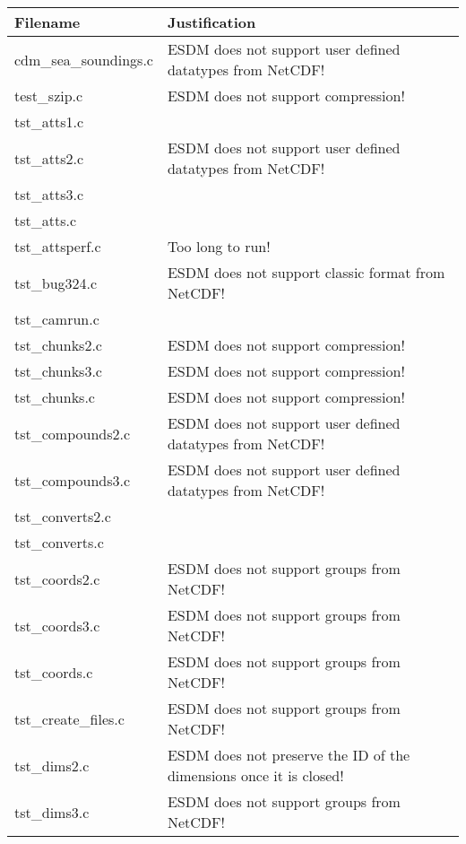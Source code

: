 \begin{table}[H]
\centering
\begin{tabular}{|l|l|}
\hline
Filename & Justification \\ \hline \hline
cdm\_sea\_soundings.c   & ESDM does not support user defined datatypes from NetCDF!          \\ \hline
test\_szip.c   &  ESDM does not support compression!         \\ \hline
tst\_atts1.c   &           \\ \hline
tst\_atts2.c   &  ESDM does not support user defined datatypes from NetCDF!         \\ \hline
tst\_atts3.c   &           \\ \hline
tst\_atts.c   &           \\ \hline
tst\_attsperf.c   &  Too long to run!         \\ \hline
tst\_bug324.c   &  ESDM does not support classic format from NetCDF!         \\ \hline
tst\_camrun.c   &           \\ \hline
tst\_chunks2.c   &  ESDM does not support compression!         \\ \hline
tst\_chunks3.c   & ESDM does not support compression!       \\ \hline
tst\_chunks.c   &  ESDM does not support compression!       \\ \hline
tst\_compounds2.c   &  ESDM does not support user defined datatypes from NetCDF!         \\ \hline
tst\_compounds3.c   &  ESDM does not support user defined datatypes from NetCDF!         \\ \hline
tst\_converts2.c   &           \\ \hline
tst\_converts.c   &           \\ \hline
tst\_coords2.c   &   ESDM does not support groups from NetCDF!       \\ \hline
tst\_coords3.c   &  ESDM does not support groups from NetCDF!         \\ \hline
tst\_coords.c   &  ESDM does not support groups from NetCDF!         \\ \hline
tst\_create\_files.c   &   ESDM does not support groups from NetCDF!        \\ \hline
tst\_dims2.c   & ESDM does not preserve the ID of the dimensions once it is closed!       \\ \hline
tst\_dims3.c   & ESDM does not support groups from NetCDF!      \\ \hline

\end{tabular}
\end{table}
